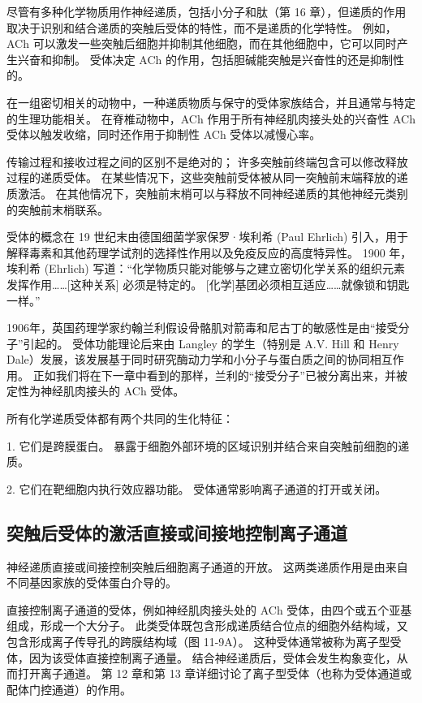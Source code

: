 尽管有多种化学物质用作神经递质，包括小分子和肽（第 16 章），但递质的作用取决于识别和结合递质的突触后受体的特性，而不是递质的化学特性。 例如，ACh 可以激发一些突触后细胞并抑制其他细胞，而在其他细胞中，它可以同时产生兴奋和抑制。 受体决定 ACh 的作用，包括胆碱能突触是兴奋性的还是抑制性的。

在一组密切相关的动物中，一种递质物质与保守的受体家族结合，并且通常与特定的生理功能相关。 在脊椎动物中，ACh 作用于所有神经肌肉接头处的兴奋性 ACh 受体以触发收缩，同时还作用于抑制性 ACh 受体以减慢心率。

传输过程和接收过程之间的区别不是绝对的； 许多突触前终端包含可以修改释放过程的递质受体。 在某些情况下，这些突触前受体被从同一突触前末端释放的递质激活。 在其他情况下，突触前末梢可以与释放不同神经递质的其他神经元类别的突触前末梢联系。

受体的概念在 19 世纪末由德国细菌学家保罗·埃利希 (Paul Ehrlich) 引入，用于解释毒素和其他药理学试剂的选择性作用以及免疫反应的高度特异性。 1900 年，埃利希 (Ehrlich) 写道：“化学物质只能对能够与之建立密切化学关系的组织元素发挥作用……[这种关系] 必须是特定的。 [化学]基团必须相互适应……就像锁和钥匙一样。”

1906年，英国药理学家约翰兰利假设骨骼肌对箭毒和尼古丁的敏感性是由“接受分子”引起的。 受体功能理论后来由 Langley 的学生（特别是 A.V. Hill 和 Henry Dale）发展，该发展基于同时研究酶动力学和小分子与蛋白质之间的协同相互作用。 正如我们将在下一章中看到的那样，兰利的“接受分子”已被分离出来，并被定性为神经肌肉接头的 ACh 受体。

所有化学递质受体都有两个共同的生化特征：

1. 它们是跨膜蛋白。 暴露于细胞外部环境的区域识别并结合来自突触前细胞的递质。 

2. 它们在靶细胞内执行效应器功能。 受体通常影响离子通道的打开或关闭。

\subsection{突触后受体的激活直接或间接地控制离子通道}

神经递质直接或间接控制突触后细胞离子通道的开放。 这两类递质作用是由来自不同基因家族的受体蛋白介导的。

直接控制离子通道的受体，例如神经肌肉接头处的 ACh 受体，由四个或五个亚基组成，形成一个大分子。 此类受体既包含形成递质结合位点的细胞外结构域，又包含形成离子传导孔的跨膜结构域（图 11-9A）。 这种受体通常被称为离子型受体，因为该受体直接控制离子通量。 结合神经递质后，受体会发生构象变化，从而打开离子通道。 第 12 章和第 13 章详细讨论了离子型受体（也称为受体通道或配体门控通道）的作用。

